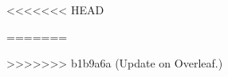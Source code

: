 

% 
% 
\setcounter{chapter}{1}
<<<<<<< HEAD

% 
% 
% 
% 
=======


>>>>>>> b1b9a6a (Update on Overleaf.)
% 
% 

